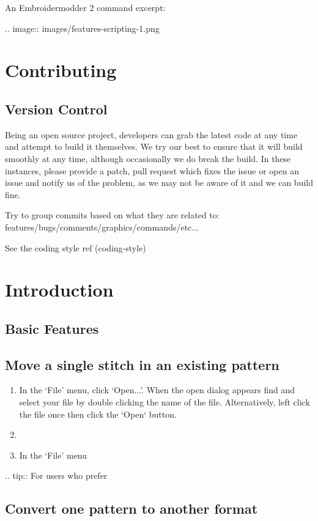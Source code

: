 \documentclass[a4paper]{report}
\begin{document}
An Embroidermodder 2 command excerpt:

.. image::
   images/features-scripting-1.png

\section{Contributing}

\subsection{Version Control}

Being an open source project, developers can grab the latest code at any time
and attempt to build it themselves. We try our best to ensure that it will build smoothly
at any time, although occasionally we do break the build. In these instances,
please provide a patch, pull request which fixes the issue or open an issue and
notify us of the problem, as we may not be aware of it and we can build fine.

Try to group commits based on what they are related to: features/bugs/comments/graphics/commands/etc...

See the coding style ref (coding-style)

\section{Introduction}

\subsection{Basic Features}

\subsection{Move a single stitch in an existing pattern}

\begin{enumerate}
\item In the `File' menu, click `Open...'. When the open dialog appears find
 and select your file by double clicking the name of the file. Alternatively,
 left click the file once then click the `Open` button.
\item
\item In the `File' menu
\end{enumerate}

.. tip::
   For users who prefer

\subsection{Convert one pattern to another format}
\end{document}
